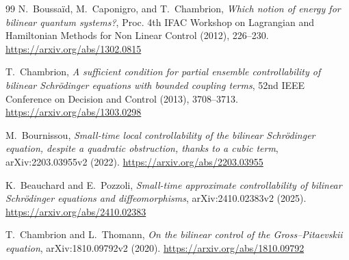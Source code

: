 \documentclass[11pt]{article}
\theoremstyle{definition}
\theoremstyle{remark}
\begin{document}
\begin{thebibliography}{99}
N.~Boussa\"id, M.~Caponigro, and T.~Chambrion,
\emph{Which notion of energy for bilinear quantum systems?},
Proc. 4th IFAC Workshop on Lagrangian and Hamiltonian Methods for Non Linear
Control (2012), 226--230.
\url{https://arxiv.org/abs/1302.0815}

T.~Chambrion,
\emph{A sufficient condition for partial ensemble controllability of bilinear
Schr\"odinger equations with bounded coupling terms},
52nd IEEE Conference on Decision and Control (2013), 3708--3713.
\url{https://arxiv.org/abs/1303.0298}

M.~Bournissou,
\emph{Small-time local controllability of the bilinear Schr\"odinger equation,
despite a quadratic obstruction, thanks to a cubic term},
arXiv:2203.03955v2 (2022).
\url{https://arxiv.org/abs/2203.03955}

K.~Beauchard and E.~Pozzoli,
\emph{Small-time approximate controllability of bilinear Schr\"odinger
equations and diffeomorphisms},
arXiv:2410.02383v2 (2025).
\url{https://arxiv.org/abs/2410.02383}

T.~Chambrion and L.~Thomann,
\emph{On the bilinear control of the Gross--Pitaevskii equation},
arXiv:1810.09792v2 (2020).
\url{https://arxiv.org/abs/1810.09792}

\end{thebibliography}
\end{document}
